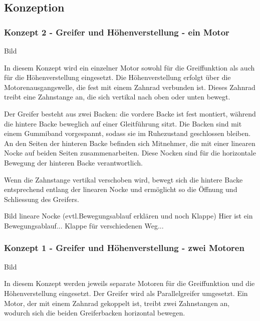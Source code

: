 \documentclass[main.tex]{subfiles} %
\begin{document}
\newpage

\subsection*{Konzeption}

\subsubsection*{Konzept 2 - Greifer und Höhenverstellung - ein Motor}

Bild \newline

In diesem Konzept wird ein einzelner Motor sowohl für die Greiffunktion als auch für die Höhenverstellung eingesetzt. 
Die Höhenverstellung erfolgt über die Motorenausgangswelle, die fest mit einem Zahnrad verbunden ist. 
Dieses Zahnrad treibt eine Zahnstange an, die sich vertikal nach oben oder unten bewegt.

Der Greifer besteht aus zwei Backen: die vordere Backe ist fest montiert, während die hintere Backe beweglich 
auf einer Gleitführung sitzt. Die Backen sind mit einem Gummiband vorgespannt, sodass sie im Ruhezustand 
geschlossen bleiben. An den Seiten der hinteren Backe befinden sich Mitnehmer, die mit einer linearen Nocke 
auf beiden Seiten zusammenarbeiten. Diese Nocken sind für die horizontale Bewegung der hinteren Backe verantwortlich.

Wenn die Zahnstange vertikal verschoben wird, bewegt sich die hintere Backe entsprechend entlang der linearen Nocke und 
ermöglicht so die Öffnung und Schliessung des Greifers. \newline


Bild lineare Nocke (evtl.Bewegungsablauf erklären und noch Klappe) \newline
Hier ist ein Bewegungsablauf... Klappe für verschiedenen Weg...


\subsubsection*{Konzept 1 - Greifer und Höhenverstellung - zwei Motoren}

Bild \newline

In diesem Konzept werden jeweils separate Motoren für die Greiffunktion und die Höhenverstellung eingesetzt. 
Der Greifer wird als Parallelgreifer umgesetzt. Ein Motor, der mit einem Zahnrad gekoppelt ist, treibt zwei 
Zahnstangen an, wodurch sich die beiden Greiferbacken horizontal bewegen.
\end{document}
